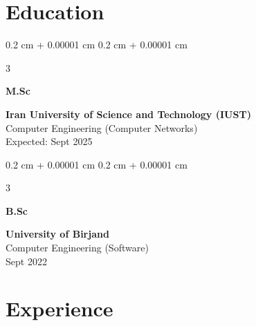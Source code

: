 \documentclass[10pt, letterpaper]{article}
\newenvironment{highlightsforbulletentries}{
	\begin{itemize}[
		topsep=0.10 cm,
		parsep=0.10 cm,
		partopsep=0pt,
		itemsep=0pt,
		leftmargin=10pt
		]
	}{
	\end{itemize}
} %
\newenvironment{onecolentry}{
	\begin{adjustwidth}{
			0.2 cm + 0.00001 cm
		}{
			0.2 cm + 0.00001 cm
		}
	}{
	\end{adjustwidth}
} %
\newenvironment{threecolentry}[3][]{
	\onecolentry
	\def\thirdColumn{#3}
	\setcolumnwidth{1 cm, \fill, 4.5 cm}
	\begin{paracol}{3}
		{\raggedright #2} \switchcolumn
	}{
		\switchcolumn \raggedleft \thirdColumn
	\end{paracol}
	\endonecolentry
} %
\let\hrefWithoutArrow\href
\renewcommand{\href}[2]{\hrefWithoutArrow{#1}{\ifthenelse{\equal{#2}{}}{ }{#2 }\raisebox{.15ex}{\footnotesize \faExternalLink*}}}
\begin{document}
	
%	
%			
%			
%			
%			
%			
%			
%			
%	


	\section{Education}

	\begin{threecolentry}{\textbf{M.Sc}}{Expected: Sept 2025}
		
	\textbf{Iran University of Science and Technology (IUST)}\\
	Computer Engineering (Computer Networks) \\

	\end{threecolentry}

	\begin{threecolentry}{\textbf{B.Sc}}{Sept 2022}
		\textbf{University of Birjand} \\
		Computer Engineering (Software)\\
	
	\end{threecolentry}

	\section{Experience}
	
\end{document}
